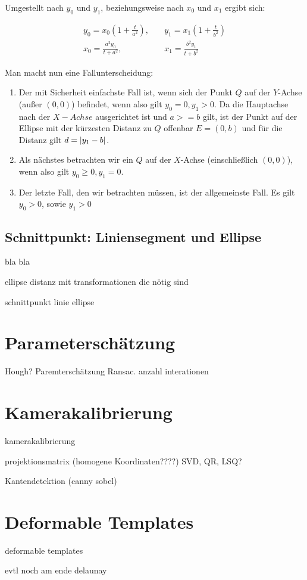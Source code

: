 Umgestellt nach $y_0$ und $y_1$, beziehungsweise nach $x_0$ und $x_1$ ergibt sich:

\begin{equation}\label{eq:ellipseDistY}
\begin{aligned}
y_0 = x_0\left(1 + \frac{t}{a^2}\right), \quad &y_1 = x_1\left(1 + \frac{t}{b^2}\right) \\
x_0 = \frac{a^2y_0}{t+a^2}, \quad & x_1 = \frac{b^2y_1}{t+b^2}
\end{aligned}
\end{equation}


Man macht nun eine Fallunterscheidung:

\begin{enumerate}
	\item Der mit Sicherheit einfachste Fall ist, wenn sich der Punkt $Q$ auf der $Y$-Achse (außer $(0,0)$) befindet, wenn also gilt $y_0 = 0, y_1 > 0$.
	Da die Hauptachse nach der $X-Achse$ ausgerichtet ist und $a >= b$ gilt, ist der Punkt auf der Ellipse mit der kürzesten Distanz zu $Q$ offenbar $E = (0, b)$ und für die Distanz gilt $d = \lvert y_1 - b\rvert$.
	\item Als nächstes betrachten wir ein $Q$ auf der $X$-Achse (einschließlich $(0,0)$), wenn also gilt  $y_0 \geq 0, y_1 = 0$.
	\item Der letzte Fall, den wir betrachten müssen, ist der allgemeinste Fall. Es gilt $y_0 > 0$, sowie $y_1 > 0$
\end{enumerate}







\subsection{Schnittpunkt: Liniensegment und Ellipse}



bla bla



\newpage
ellipse distanz mit transformationen die nötig sind


schnittpunkt linie ellipse


\section{Parameterschätzung}

Hough?
Paremterschätzung Ransac. anzahl interationen




\section{Kamerakalibrierung}

kamerakalibrierung

projektionsmatrix
(homogene Koordinaten????)
SVD, QR, LSQ?



Kantendetektion (canny sobel)

\section{Deformable Templates}


deformable templates

evtl noch am ende delaunay